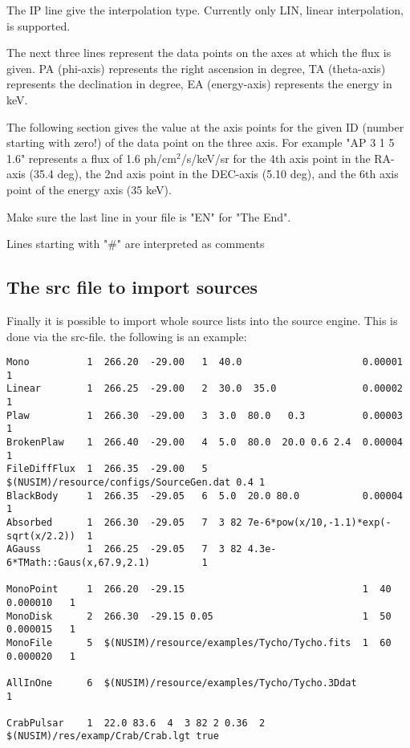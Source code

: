 The IP line give the interpolation type. Currently only LIN, linear interpolation, is supported.

The next three lines represent the data points on the axes at which the flux is given. PA (phi-axis) represents the right ascension in degree, TA (theta-axis) represents the declination in degree, EA (energy-axis) represents the energy in keV.

The following section gives the value at the axis points for the given ID (number starting with zero!) of the data point on the three axis.
For example "AP 3 1 5 1.6" represents a flux of 1.6 ph/cm$^2$/s/keV/sr for the 4th axis point in the RA-axis (35.4 deg), the 2nd axis point in the DEC-axis (5.10 deg), and the 6th axis point of the energy axis (35 keV).

Make sure the last line in your file is "EN" for "The End".

Lines starting with "\#" are interpreted as comments


\subsection{The src file to import sources}

Finally it is possible to import whole source lists into the source engine.
This is done via the src-file. the following is an example:
{\footnotesize
\begin{verbatim}
Mono          1  266.20  -29.00   1  40.0                     0.00001            1
Linear        1  266.25  -29.00   2  30.0  35.0               0.00002            1
Plaw          1  266.30  -29.00   3  3.0  80.0   0.3          0.00003            1
BrokenPlaw    1  266.40  -29.00   4  5.0  80.0  20.0 0.6 2.4  0.00004            1
FileDiffFlux  1  266.35  -29.00   5  $(NUSIM)/resource/configs/SourceGen.dat 0.4 1       
BlackBody     1  266.35  -29.05   6  5.0  20.0 80.0           0.00004            1 
Absorbed      1  266.30  -29.05   7  3 82 7e-6*pow(x/10,-1.1)*exp(-sqrt(x/2.2))  1
AGauss        1  266.25  -29.05   7  3 82 4.3e-6*TMath::Gaus(x,67.9,2.1)         1

MonoPoint     1  266.20  -29.15                               1  40   0.000010   1 
MonoDisk      2  266.30  -29.15 0.05                          1  50   0.000015   1     
MonoFile      5  $(NUSIM)/resource/examples/Tycho/Tycho.fits  1  60   0.000020   1

AllInOne      6  $(NUSIM)/resource/examples/Tycho/Tycho.3Ddat                    1

CrabPulsar    1  22.0 83.6  4  3 82 2 0.36  2 $(NUSIM)/res/examp/Crab/Crab.lgt true
\end{verbatim}
}

